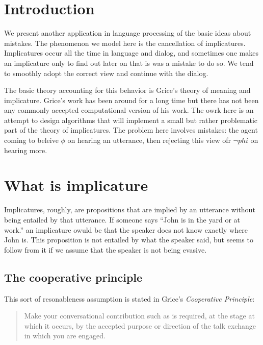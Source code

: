 \documentclass{article}
\begin{document}
%
\section{Introduction}


We present another application in language processing of the basic
ideas about mistakes. The phenomenon we model here is the cancellation
of implicatures. Implicatures occur all the time in language and dialog,
and sometimes one makes an implicature only to find out later on that
is was a mistake to do so. We tend to smoothly adopt the correct view
and continue with the dialog.

The basic theory accounting for this behavior is Grice's \cite{}
theory of meaning and implicature. Grice's work has been around for a
long time but there has not been any commonly accepted computational
version of his work. The owrk here is an attempt to design algorithms
that will implement a small but rather problematic part of the theory of
implicatures. The problem here involves mistakes: the agent coming to
beleive $\phi$ on hearing an utterance, then rejecting this view ofr
$\neg phi$ on hearing more.

\section{What is implicature}


Implicatures, roughly, are propositions that are implied by an
utterance without being entailed by that utterance. If someone says
``John is in the yard or at work.'' an implicature owuld be that the
speaker does not know exactly where John is. This proposition is not
entailed by what the speaker said, but seems to follow from it if we
assume that the speaker is not being evasive.

\subsection{The cooperative principle}

This sort of resonableness assumption is stated in Grice's \cite{}
{\em Cooperative Principle}: 
\begin{quote}
Make your conversational contribution such as is required, at the
stage at which it occurs, by the accepted purpose or direction of the
talk exchange in which you are engaged.
\end{quote}
\end{document}
